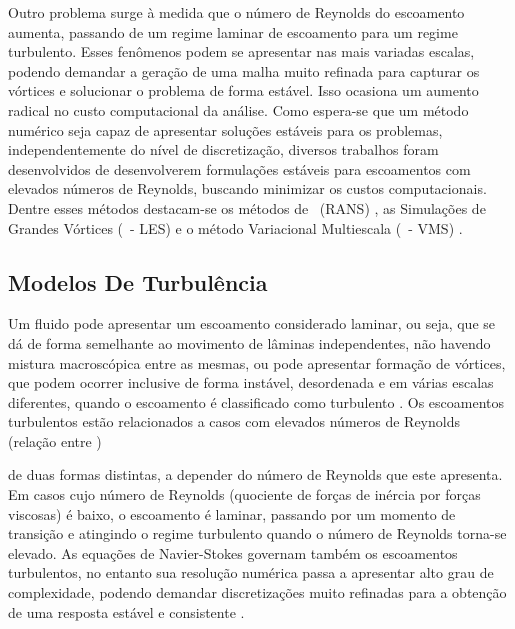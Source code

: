 
Outro problema surge à medida que o número de Reynolds do escoamento aumenta, passando de um regime laminar de escoamento para um regime turbulento. Esses fenômenos podem se apresentar nas mais variadas escalas, podendo demandar a geração de uma malha muito refinada para capturar os vórtices e solucionar o problema de forma estável. Isso ocasiona um aumento radical no custo computacional da análise. Como espera-se que um método numérico seja capaz de apresentar soluções estáveis para os problemas, independentemente do nível de discretização, diversos trabalhos foram desenvolvidos de desenvolverem formulações estáveis para escoamentos com elevados números de Reynolds, buscando minimizar os custos computacionais. Dentre esses métodos destacam-se os métodos de \RANS\ (RANS) \cite{speziale1991analytical,alfonsi2009reynolds,ling2015evaluation}, as Simulações de Grandes Vórtices (\LES\ - LES) \cite{germano1991dynamic,piomelli1999large,hughes2000large,vsekutkovski2021partitioned} e o método Variacional Multiescala (\VMS\ - VMS) \cite{hughes1995multiscale,hughes1998variational,hughes2002variational,bazilevs2010large,bazilevs2013computational}.

\subsection{Modelos De Turbulência} \label{MT}

Um fluido pode apresentar um escoamento considerado laminar, ou seja, que se dá de forma semelhante ao movimento de lâminas independentes, não havendo mistura macroscópica entre as mesmas, ou pode apresentar formação de vórtices, que podem ocorrer inclusive de forma instável, desordenada e em várias escalas diferentes, quando o escoamento é classificado como turbulento \cite{popiolek2005analise,shaughnessy2005introduction}. Os escoamentos turbulentos estão relacionados a casos com elevados números de Reynolds (relação entre )

de duas formas distintas, a depender do número de Reynolds que este apresenta. Em casos cujo número de Reynolds (quociente de forças de inércia por forças viscosas) é baixo, o escoamento é laminar, passando por um momento de transição e atingindo o regime turbulento quando o número de Reynolds torna-se elevado. As equações de Navier-Stokes governam também os escoamentos turbulentos, no entanto sua resolução numérica passa a apresentar alto grau de complexidade, podendo demandar discretizações muito refinadas para a obtenção de uma resposta estável e consistente \cite{Adicionar citação para dar suporte ao texto}.

